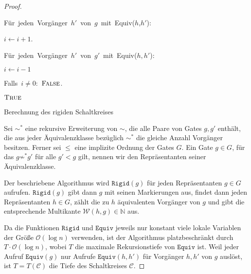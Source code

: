 \begin{proof}
\begin{algorithm}
\begin{lyxcode}
\begin{lyxcode}
\begin{lyxcode}
Für~jeden~Vorgänger~$h'$~von~$g$~mit~Equiv($h$,$h'$):~

\begin{lyxcode}
$i\leftarrow i+1$.
\end{lyxcode}
Für~jeden~Vorgänger~$h'$~von~$g'$~mit~Equiv($h,h'$):~

\begin{lyxcode}
$i\leftarrow i-1$
\end{lyxcode}
Falls~$i\neq0$:~$\textsc{False}$.
\end{lyxcode}
$\textsc{True}$
\end{lyxcode}
\end{lyxcode}
\caption{\label{alg:rigid}Berechnung des rigiden Schaltkreises}
\end{algorithm}

Sei $\sim^{*}$ eine rekursive Erweiterung von $\sim$, die alle Paare
von Gates $g,g'$ enthält, die aus jeder Äquivalenzklasse bezüglich
$\sim^{*}$ die gleiche Anzahl Vorgänger besitzen. Ferner sei $\leqslant$
eine implizite Ordnung der Gates $G$. Ein Gate $g\in G$, für das
$g\not\sim^{*}g'$ für alle $g'<g$ gilt, nennen wir den Repräsentanten
seiner Äquivalenzklasse.

Der beschriebene Algorithmus wird $\mathtt{Rigid}\left(g\right)$
für jeden Repräsentanten $g\in G$ aufrufen. $\mathtt{Rigid}\left(g\right)$
gibt dann $g$ mit seinen Markierungen aus, findet dann jeden Repräsentanten
$h\in G$, zählt die zu $h$ äquivalenten Vorgänger von $g$ und gibt
die entsprechende Multikante $\mathcal{W}\left(h,g\right)\in\mathbb{N}$
aus.

Da die Funktionen $\mathtt{Rigid}$ und $\mathtt{Equiv}$ jeweils
nur konstant viele lokale Variablen der Größe $\mathcal{O}\left(\log n\right)$
verwenden, ist der Algorithmus platzbeschränkt durch $T\cdot\mathcal{O}\left(\log n\right)$,
wobei $T$ die maximale Rekursionstiefe von $\mathtt{Equiv}$ ist.
Weil jeder Aufruf $\mathtt{Equiv}\left(g\right)$ nur Aufrufe $\mathtt{Equiv}\left(h,h'\right)$
für Vorgänger $h,h'$ von $g$ auslöst, ist $T=T\left(\mathcal{C}\right)$
die Tiefe des Schaltkreises $\mathcal{C}$.
\end{proof}


